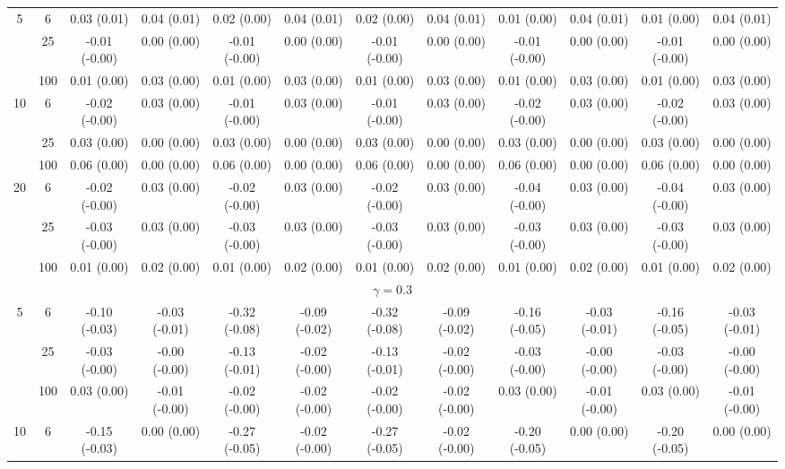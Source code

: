 \documentclass[
  man]{apa6}
\newenvironment{lltable}{\begin{landscape}\centering\begin{ThreePartTable}}{\end{ThreePartTable}\end{landscape}}
\begin{document}
\begin{lltable}
{\begin{longtable}{cccccccccccc}
5 & 6 & 0.03 (0.01) & 0.04 (0.01) & 0.02 (0.00) & 0.04 (0.01) & 0.02 (0.00) & 0.04 (0.01) & 0.01 (0.00) & 0.04 (0.01) & 0.01 (0.00) & 0.04 (0.01)\\
 & 25 & -0.01 (-0.00) & 0.00 (0.00) & -0.01 (-0.00) & 0.00 (0.00) & -0.01 (-0.00) & 0.00 (0.00) & -0.01 (-0.00) & 0.00 (0.00) & -0.01 (-0.00) & 0.00 (0.00)\\
 & 100 & 0.01 (0.00) & 0.03 (0.00) & 0.01 (0.00) & 0.03 (0.00) & 0.01 (0.00) & 0.03 (0.00) & 0.01 (0.00) & 0.03 (0.00) & 0.01 (0.00) & 0.03 (0.00)\\
10 & 6 & -0.02 (-0.00) & 0.03 (0.00) & -0.01 (-0.00) & 0.03 (0.00) & -0.01 (-0.00) & 0.03 (0.00) & -0.02 (-0.00) & 0.03 (0.00) & -0.02 (-0.00) & 0.03 (0.00)\\
 & 25 & 0.03 (0.00) & 0.00 (0.00) & 0.03 (0.00) & 0.00 (0.00) & 0.03 (0.00) & 0.00 (0.00) & 0.03 (0.00) & 0.00 (0.00) & 0.03 (0.00) & 0.00 (0.00)\\
 & 100 & 0.06 (0.00) & 0.00 (0.00) & 0.06 (0.00) & 0.00 (0.00) & 0.06 (0.00) & 0.00 (0.00) & 0.06 (0.00) & 0.00 (0.00) & 0.06 (0.00) & 0.00 (0.00)\\
20 & 6 & -0.02 (-0.00) & 0.03 (0.00) & -0.02 (-0.00) & 0.03 (0.00) & -0.02 (-0.00) & 0.03 (0.00) & -0.04 (-0.00) & 0.03 (0.00) & -0.04 (-0.00) & 0.03 (0.00)\\
 & 25 & -0.03 (-0.00) & 0.03 (0.00) & -0.03 (-0.00) & 0.03 (0.00) & -0.03 (-0.00) & 0.03 (0.00) & -0.03 (-0.00) & 0.03 (0.00) & -0.03 (-0.00) & 0.03 (0.00)\\
 & 100 & 0.01 (0.00) & 0.02 (0.00) & 0.01 (0.00) & 0.02 (0.00) & 0.01 (0.00) & 0.02 (0.00) & 0.01 (0.00) & 0.02 (0.00) & 0.01 (0.00) & 0.02 (0.00)\\
\multicolumn{12}{c}{$\gamma = 0.3$}\\
5 & 6 & -0.10 (-0.03) & -0.03 (-0.01) & -0.32 (-0.08) & -0.09 (-0.02) & -0.32 (-0.08) & -0.09 (-0.02) & -0.16 (-0.05) & -0.03 (-0.01) & -0.16 (-0.05) & -0.03 (-0.01)\\
 & 25 & -0.03 (-0.00) & -0.00 (-0.00) & -0.13 (-0.01) & -0.02 (-0.00) & -0.13 (-0.01) & -0.02 (-0.00) & -0.03 (-0.00) & -0.00 (-0.00) & -0.03 (-0.00) & -0.00 (-0.00)\\
 & 100 & 0.03 (0.00) & -0.01 (-0.00) & -0.02 (-0.00) & -0.02 (-0.00) & -0.02 (-0.00) & -0.02 (-0.00) & 0.03 (0.00) & -0.01 (-0.00) & 0.03 (0.00) & -0.01 (-0.00)\\
10 & 6 & -0.15 (-0.03) & 0.00 (0.00) & -0.27 (-0.05) & -0.02 (-0.00) & -0.27 (-0.05) & -0.02 (-0.00) & -0.20 (-0.05) & 0.00 (0.00) & -0.20 (-0.05) & 0.00 (0.00)\\

\end{longtable}}
\end{lltable}
\end{document}
